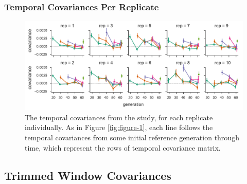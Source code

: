 \documentclass[11pt]{article}
\begin{document}
{{\begin{figure}[!ht]
  \label{suppfig:barghi-correction}
\end{figure}

\clearpage

\subsubsection{\textcite{Barghi2019-qy} Temporal Covariances Per Replicate}
\begin{figure}[!ht]
  \centering
  \includegraphics[width=\textwidth]{figures/barghi-cov-panels.pdf}

  \caption{The temporal covariances from the \textcite{Barghi2019-qy} study,
  for each replicate individually. As in Figure \ref{fig:figure-1}, each line
  follows the temporal covariances from some initial reference generation through
  time, which represent the rows of temporal covariance matrix.}

  \label{suppfig:barghi-cov-panels}
\end{figure}


\clearpage

\subsection{\textcite{Barghi2019-qy} Trimmed Window Covariances}
\begin{table}
  \centering
  \footnotesize
  \centering
  \begin{tabular}{l c c c c c c}


\end{tabular}
\end{table}}}
\end{document}
